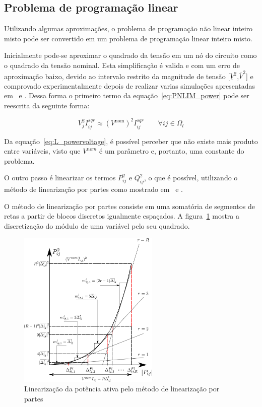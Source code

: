 \subsection{Problema de programação linear}

Utilizando algumas aproximações, o problema de programação não linear inteiro misto pode ser convertido em um problema de programação linear inteiro misto.

Inicialmente pode-se aproximar o quadrado da tensão em um nó do circuito como o quadrado da tensão nominal.
Esta simplificação é valida e com um erro de aproximação baixo, devido ao intervalo restrito da magnitude de tensão [$\underline{V}^2$,$\overline{V}^2$] e comprovado experimentalmente depois de realizar varias simulações apresentadas em~\cite{Goncalves2013ModelosRadiais} e \cite{Alves2012Alocacao-}.
Dessa forma o primeiro termo da equação~\eqref{eq:PNLIM_power} pode ser reescrita da seguinte forma:

\begin{equation}\label{eq:L_powervoltage}
    V_{j}^{2}I_{ij}^{sqr} \approx (V^{\text{nom}})^{2}I_{ij}^{sqr}\qquad\forall ij\in\Omega_{l}
\end{equation}

Da equação~\eqref{eq:L_powervoltage}, é possível perceber que não existe mais produto entre variáveis, visto que $V^{nom}$ é um parâmetro e, portanto, uma constante do problema.

O outro passo é linearizar os termos $P_{ij}^2$ e $Q_{ij}^2$, o que é possível, utilizando o método de linearização por partes como mostrado em~\cite{Goncalves2013ModelosRadiais} e \cite{Alves2012Alocacao-}.

O método de linearização por partes consiste em uma somatória de segmentos de retas a partir de blocos discretos igualmente espaçados.
A figura~\ref{fig:linearization} mostra a discretização do módulo de uma variável pelo seu quadrado.

\begin{figure}[H]
    \centering
    \includegraphics[width = 0.6\textwidth]{5_Formulation/lin.png}
    \caption{Linearização da potência ativa pelo método de linearização por partes}
    \label{fig:linearization}
\end{figure}{}

